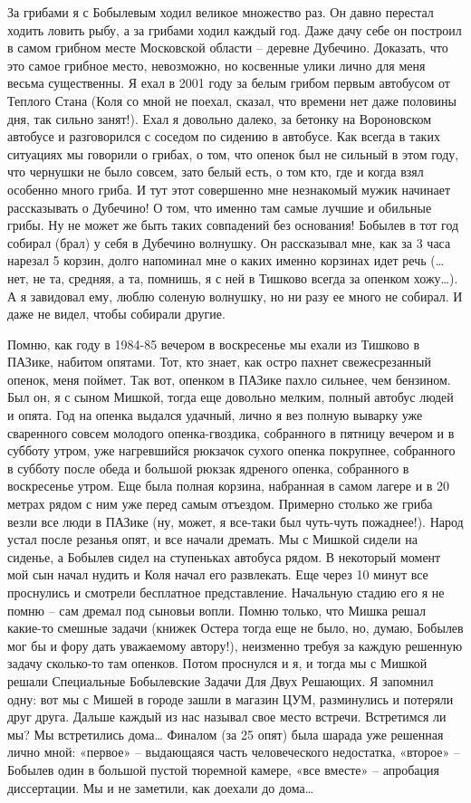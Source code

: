 За грибами я с Бобылевым ходил великое множество раз. Он давно перестал ходить ловить рыбу, а за грибами ходил каждый год. Даже дачу себе он построил в самом грибном месте Московской области – деревне Дубечино. Доказать, что это самое грибное место, невозможно, но косвенные улики лично для меня весьма существенны. Я ехал в 2001 году за белым грибом первым автобусом от Теплого Стана (Коля со мной не поехал, сказал, что времени нет даже половины дня, так сильно занят!). Ехал я довольно далеко, за бетонку на Вороновском автобусе и разговорился с соседом по сидению в автобусе. Как всегда в таких ситуациях мы говорили о грибах, о том, что опенок был не сильный в этом году, что чернушки не было совсем, зато белый есть, о том кто, где и когда взял особенно много гриба. И тут этот совершенно мне незнакомый мужик начинает рассказывать о Дубечино! О том, что именно там самые лучшие и обильные грибы. Ну не может же быть таких совпадений без основания! Бобылев в тот год собирал (брал) у себя в Дубечино волнушку. Он рассказывал мне, как за 3 часа нарезал 5 корзин, долго напоминал мне о каких именно корзинах идет речь (…нет, не та, средняя, а та, помнишь, я с ней в Тишково всегда за опенком хожу…). А я завидовал ему, люблю соленую волнушку, но ни разу ее много не собирал. И даже не видел, чтобы собирали другие.

Помню, как году в 1984-85 вечером в воскресенье мы ехали из Тишково в ПАЗике, набитом опятами. Тот, кто знает, как остро пахнет свежесрезанный опенок, меня поймет. Так вот, опенком в ПАЗике пахло сильнее, чем бензином. Был он, я с сыном Мишкой, тогда еще довольно мелким, полный автобус людей и опята. Год на опенка выдался удачный, лично я вез полную выварку уже сваренного совсем молодого опенка-гвоздика, собранного в пятницу вечером и в субботу утром, уже нагревшийся рюкзачок сухого опенка покрупнее, собранного в субботу после обеда и большой рюкзак ядреного опенка, собранного в воскресенье утром. Еще была полная корзина, набранная в самом лагере и в 20 метрах рядом с ним уже перед самым отъездом. Примерно столько же гриба везли все люди в ПАЗике (ну, может, я все-таки был чуть-чуть пожаднее!). Народ устал после резанья опят, и все начали дремать. Мы с Мишкой сидели на сиденье, а Бобылев сидел на ступеньках автобуса рядом. В некоторый момент мой сын начал нудить и Коля начал его развлекать. Еще через 10 минут все проснулись и смотрели бесплатное представление. Начальную стадию его я не помню – сам дремал под сыновьи вопли. Помню только, что Мишка решал какие-то смешные задачи (книжек Остера тогда еще не было, но, думаю, Бобылев мог бы и фору дать уважаемому автору!), неизменно требуя за каждую решенную задачу сколько-то там опенков. Потом  проснулся и я, и тогда мы с Мишкой решали Специальные Бобылевские Задачи Для Двух Решающих. Я запомнил одну: вот мы с Мишей в городе зашли в магазин ЦУМ, разминулись и потеряли друг друга. Дальше каждый из нас называл свое место встречи. Встретимся ли мы? Мы встретились дома… Финалом (за 25 опят) была шарада уже решенная лично мной: «первое» – выдающаяся часть человеческого недостатка, «второе» – Бобылев один в большой пустой тюремной камере, «все вместе» – апробация диссертации. Мы и не заметили, как доехали до дома…

